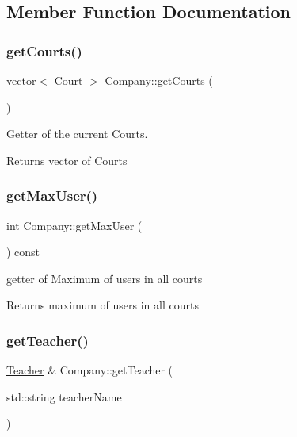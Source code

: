 \subsection{Member Function Documentation}
\mbox{\label{class_company_afa0ab125a0ba718fe2c13802fe1703be}} 
\subsubsection{\texorpdfstring{get\+Courts()}{getCourts()}}
{\footnotesize\ttfamily vector$<$ \mbox{\hyperlink{class_court}{Court}} $>$ Company\+::get\+Courts (\begin{DoxyParamCaption}{ }\end{DoxyParamCaption})}



Getter of the current Courts. 

\begin{DoxyReturn}{Returns}
vector of Courts 
\end{DoxyReturn}
\mbox{\label{class_company_a837fd39a8f03c20a3ceb8617410956b7}} 
\subsubsection{\texorpdfstring{get\+Max\+User()}{getMaxUser()}}
{\footnotesize\ttfamily int Company\+::get\+Max\+User (\begin{DoxyParamCaption}{ }\end{DoxyParamCaption}) const}



getter of Maximum of users in all courts 

\begin{DoxyReturn}{Returns}
maximum of users in all courts 
\end{DoxyReturn}
\mbox{\label{class_company_a7867ccfc2961810389f118feb827e63e}} 
\subsubsection{\texorpdfstring{get\+Teacher()}{getTeacher()}}
{\footnotesize\ttfamily \mbox{\hyperlink{class_teacher}{Teacher}} \& Company\+::get\+Teacher (\begin{DoxyParamCaption}\item[{std\+::string}]{teacher\+Name }\end{DoxyParamCaption})}



